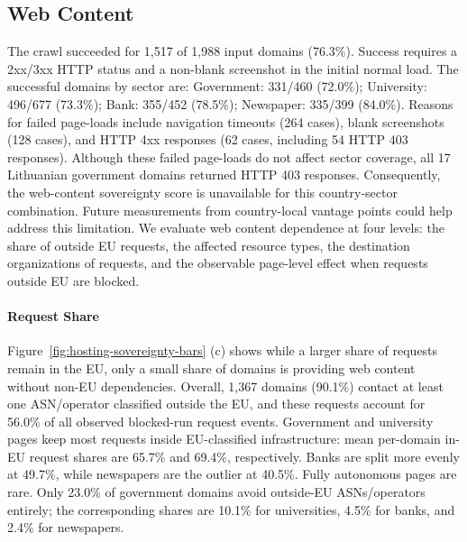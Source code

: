 
\subsection{Web Content}
\label{sec:assessment_3rdpartydep}

The crawl succeeded for 1,517 of 1,988 input domains (76.3\%). Success requires a 2xx/3xx HTTP status and a non-blank screenshot in the initial normal load. The successful domains by sector are: Government: 331/460 (72.0\%); University: 496/677 (73.3\%); Bank: 355/452 (78.5\%); Newspaper: 335/399 (84.0\%). Reasons for failed page-loads include navigation timeouts (264 cases), blank screenshots (128 cases), and HTTP 4xx responses (62 cases, including 54 HTTP 403 responses). Although these failed page-loads do not affect sector coverage, all 17 Lithuanian government domains returned HTTP 403 responses. Consequently, the web-content sovereignty score is unavailable for this country-sector combination. Future measurements from country-local vantage points could help address this limitation. We evaluate web content dependence at four levels: the share of outside EU requests, the affected resource types, the destination organizations of requests, and the observable page-level effect when requests outside EU are blocked. 

\paragraph{Request Share}
Figure~\ref{fig:hosting-sovereignty-bars} (c) shows while a larger share of requests remain in the EU, only a small share of domains is providing web content without non-EU dependencies.
Overall, 1,367 domains (90.1\%) contact at least one ASN/operator classified outside the EU, and these requests account for 56.0\% of all observed blocked-run request events. Government and university pages keep most requests inside EU-classified infrastructure: mean per-domain in-EU request shares are 65.7\% and 69.4\%, respectively. Banks are split more evenly at 49.7\%, while newspapers are the outlier at 40.5\%. Fully autonomous pages are rare. Only 23.0\% of government domains avoid outside-EU ASNs/operators entirely; the corresponding shares are 10.1\% for universities, 4.5\% for banks, and 2.4\% for newspapers.

